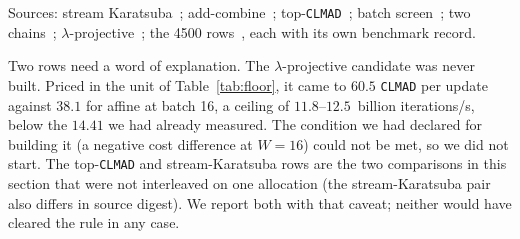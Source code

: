 Sources: stream Karatsuba~; add-combine~;
top-\texttt{CLMAD}~; batch
screen~; two
chains~; $\lambda$-projective~;
the 4500 rows~, each with
its own benchmark record.

Two rows need a word of explanation. The $\lambda$-projective
candidate was never built. Priced in the unit of
Table~\ref{tab:floor}, it came to $60.5$ \texttt{CLMAD} per update
against $38.1$ for affine at batch 16, a ceiling of $11.8$--$12.5$~billion iterations/s,
below the $14.41$ we had already measured. The condition we had
declared for building it (a negative cost difference at $W=16$) could
not be met, so we did not start. The top-\texttt{CLMAD} and
stream-Karatsuba rows are the two comparisons in this section that
were not interleaved on one allocation (the stream-Karatsuba pair also
differs in source digest). We report both with that caveat; neither
would have cleared the rule in any case.
